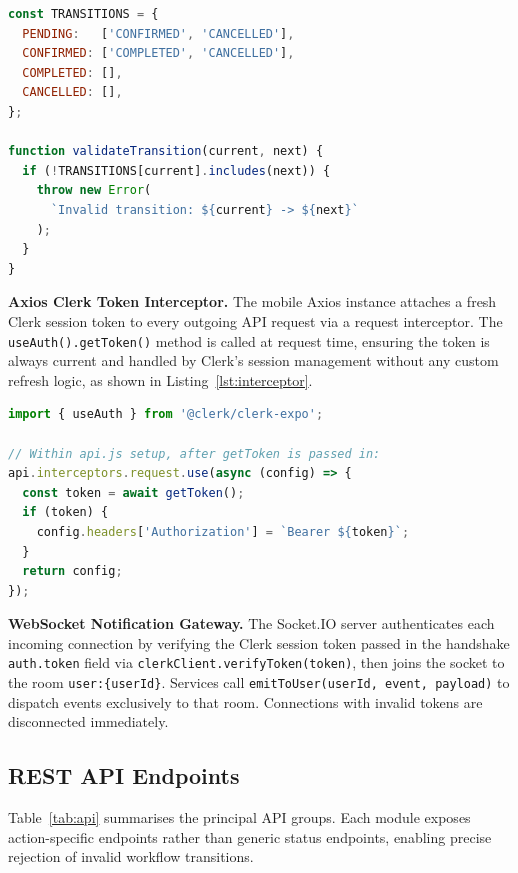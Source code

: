 \documentclass[12pt,a4paper]{report}
\begin{document}
\begin{lstlisting}[language=JavaScript, caption={Booking FSM Transition Map}, label={lst:fsm}]
const TRANSITIONS = {
  PENDING:   ['CONFIRMED', 'CANCELLED'],
  CONFIRMED: ['COMPLETED', 'CANCELLED'],
  COMPLETED: [],
  CANCELLED: [],
};

function validateTransition(current, next) {
  if (!TRANSITIONS[current].includes(next)) {
    throw new Error(
      `Invalid transition: ${current} -> ${next}`
    );
  }
}
\end{lstlisting}

\textbf{Axios Clerk Token Interceptor.}
The mobile Axios instance attaches a fresh Clerk session token to every outgoing API
request via a request interceptor. The \texttt{useAuth().getToken()} method is called
at request time, ensuring the token is always current and handled by Clerk's session
management without any custom refresh logic, as shown in
Listing~\ref{lst:interceptor}.

\begin{lstlisting}[language=JavaScript, caption={Axios Request Interceptor -- Clerk Token Attachment}, label={lst:interceptor}]
import { useAuth } from '@clerk/clerk-expo';

// Within api.js setup, after getToken is passed in:
api.interceptors.request.use(async (config) => {
  const token = await getToken();
  if (token) {
    config.headers['Authorization'] = `Bearer ${token}`;
  }
  return config;
});
\end{lstlisting}

\textbf{WebSocket Notification Gateway.}
The Socket.IO server authenticates each incoming connection by verifying the Clerk
session token passed in the handshake \texttt{auth.token} field via
\texttt{clerkClient.verifyToken(token)}, then joins the socket to the room
\texttt{user:\{userId\}}. Services call \texttt{emitToUser(userId, event, payload)} to
dispatch events exclusively to that room. Connections with invalid tokens are
disconnected immediately.

\subsection{REST API Endpoints}

Table~\ref{tab:api} summarises the principal API groups. Each module exposes
action-specific endpoints rather than generic status endpoints, enabling precise rejection
of invalid workflow transitions.
\end{document}
